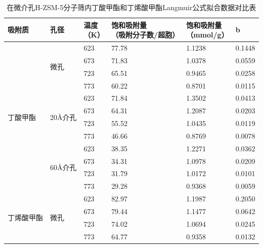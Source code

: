 \begin{table}[H]
	\small
	\centering
	\caption{在微介孔H-ZSM-5分子筛内丁酸甲酯和丁烯酸甲酯Langmuir公式拟合数据对比表}
	\begin{tabular}{p{2cm}<{\centering}p{2cm}<{\centering}p{1cm}<{\centering}p{4cm}<{\centering}p{2cm}<{\centering}p{2cm}<{\centering}}
        \toprule
        吸附质&孔径&\makecell*[c]{温度\\（K）}&\makecell*[c]{饱和吸附量\\（吸附分子数/超胞）}&\makecell*[c]{饱和吸附量\\（mmol/g）}&b\\
        \midrule
        \multirow{12}{*}{丁酸甲酯}&\multirow{4}{*}{微孔}&623&77.78&1.1238&0.1448\\
        &&673&71.83&1.0378&0.0559\\
        &&723&65.51&0.9465&0.0258\\
        &&773&60.22&0.8701&0.0115\\
        \cline{2-6}
        &\multirow{4}{*}{20Å介孔}&623&71.84&1.3502&0.0413\\
        &&673&64.31&1.2087&0.0203\\
        &&723&55.52&1.0435&0.0119\\
        &&773&46.66&0.8769&0.0078\\
        \cline{2-6}
        &\multirow{4}{*}{60Å介孔}&623&38.35&1.2271&0.0362\\
        &&673&34.31&1.0978&0.0209\\
        &&723&31.79&1.0172&0.0101\\
        &&773&29.28&0.9368&0.0059\\
        \hline
        \multirow{4}{*}{丁烯酸甲酯}&\multirow{4}{*}{微孔}&623&82.97&1.1987&0.2050\\
        &&673&79.44&1.1477&0.0642\\
        &&723&74.02&1.0694&0.0245\\
        &&773&64.77&0.9358&0.0132\\
		\bottomrule
	\end{tabular}
	\label{tab:sA}
\end{table}

